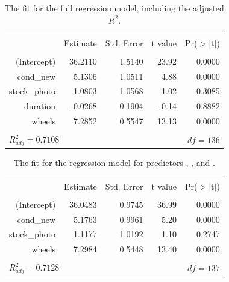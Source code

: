 \begin{table}[ht]
\centering
\begin{tabular}{rrrrr}
  \hline
  \vspace{-3.7mm} & & & & \\
 & Estimate & Std. Error & t value & Pr($>$$|$t$|$) \\ 
  \hline
  \vspace{-3.8mm} & & & & \\
(Intercept) & 36.2110 & 1.5140 & 23.92 & 0.0000 \\ 
  cond\_\hspace{0.3mm}new & 5.1306 & 1.0511 & 4.88 & 0.0000 \\ 
  stock\_\hspace{0.3mm}photo & 1.0803 & 1.0568 & 1.02 & 0.3085 \\ 
  duration & -0.0268 & 0.1904 & -0.14 & 0.8882 \\ 
  wheels & 7.2852 & 0.5547 & 13.13 & 0.0000 \\ 
   \hline
  \vspace{-3.6mm} & & & & \\
\multicolumn{3}{l}{$R_{adj}^2 = 0.7108$}&\multicolumn{2}{r}{$df=136$}
\end{tabular}
\caption{The fit for the full regression model, including the adjusted $R^2$.}
\label{outputForMultipleRegrOutputForAllPredictors2}
\end{table}

\begin{table}[ht]
\centering
\begin{tabular}{rrrrr}
  \hline
  \vspace{-3.7mm} & & & & \\
 & Estimate & Std. Error & t value & Pr($>$$|$t$|$) \\ 
  \hline
  \vspace{-3.8mm} & & & & \\
(Intercept) & 36.0483 & 0.9745 & 36.99 & 0.0000 \\ 
  cond\_\hspace{0.3mm}new & 5.1763 & 0.9961 & 5.20 & 0.0000 \\ 
  stock\_\hspace{0.3mm}photo & 1.1177 & 1.0192 & 1.10 & 0.2747 \\ 
  wheels & 7.2984 & 0.5448 & 13.40 & 0.0000 \\ 
   \hline
  \vspace{-3.6mm} & & & & \\
\multicolumn{3}{l}{$R_{adj}^2 = 0.7128$}&\multicolumn{2}{r}{$df=137$}
\end{tabular}
\caption{The fit for the regression model for predictors , , and .}
\label{marioKartMultipleRegressionModelAllButDuration}
\end{table}

